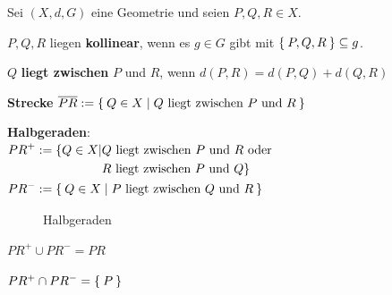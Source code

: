 \begin{definition}
    Sei $(X, d, G)$ eine Geometrie und seien $P, Q, R \in X$.
    \begin{defenum}
        \item $P, Q, R$ liegen \textbf{kollinear},
              wenn es $g \in G$ gibt mit $\Set{P, Q, R} \subseteq g$.
        \item $Q$ \textbf{liegt zwischen} $P$
              und $R$, wenn $d(P, R) = d(P, Q) + d(Q, R)$
        \item \textbf{Strecke} $\overline{PR} := \Set{Q \in X | Q \text{ liegt zwischen } P \text{ und } R}$
        \item \textbf{Halbgeraden}:\\
              $\begin{aligned}[t]
                  PR^+ &:= \{Q \in X | Q \text{ liegt zwischen } P \text{ und } R \text{ oder } \\
             &\hphantom{:= \{Q \in X |\;} R \text{ liegt zwischen } P \text{ und } Q\}\\
                  PR^- &:= \Set{Q \in X | P \text{ liegt zwischen } Q \text{ und } R}
              \end{aligned}$
    \end{defenum}
\end{definition}

\begin{figure}[htp]
    \centering
    
    \caption{Halbgeraden}
    \label{fig:halbgeraden}
\end{figure}

\begin{bemerkung}
    \begin{bemenum}
        \item $PR^+ \cup PR^- = PR$
        \item $PR^+ \cap PR^- = \Set{P}$
    \end{bemenum}
\end{bemerkung}

